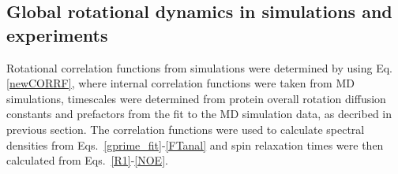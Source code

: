 \documentclass[pre,aps,floatfix,authordate1-4,twocolumn]{revtex4-1}
\begin{document}

\subsection{Global rotational dynamics in simulations and experiments}
Rotational correlation functions from simulations were determined by using
Eq. \ref{newCORRF}, where internal correlation functions were taken from
MD simulations, timescales were determined from protein overall rotation
diffusion constants and prefactors from the fit to the MD simulation data,
as decribed in previous section. The correlation functions were used to calculate
spectral densities from Eqs.~\ref{gprime_fit}-\ref{FTanal} and
spin relaxation times were then calculated from Eqs.~\ref{R1}-\ref{NOE}.
\end{document}
